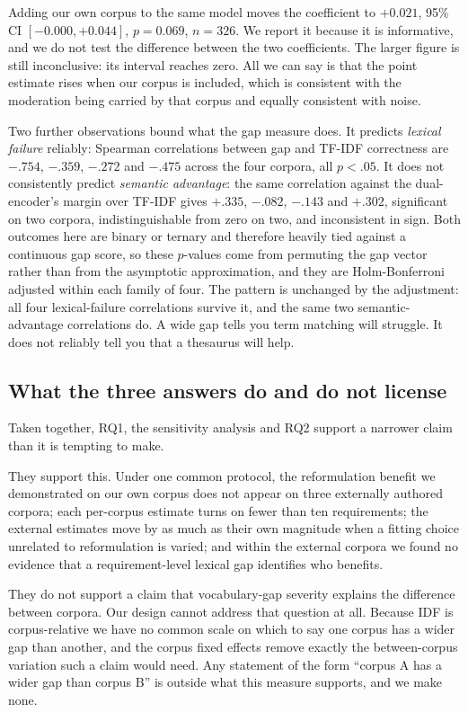 \documentclass[smallextended,natbib]{svjour3}
\begin{document}
Adding our own corpus to the same model moves the coefficient to $+0.021$, 95\% CI $[-0.000, +0.044]$, $p = 0.069$, $n = 326$. We report it because it is informative, and we do not test the difference between the two coefficients. The larger figure is still inconclusive: its interval reaches zero. All we can say is that the point estimate rises when our corpus is included, which is consistent with the moderation being carried by that corpus and equally consistent with noise.

Two further observations bound what the gap measure does. It predicts \emph{lexical failure} reliably: Spearman correlations between gap and TF-IDF correctness are $-.754$, $-.359$, $-.272$ and $-.475$ across the four corpora, all $p < .05$. It does not consistently predict \emph{semantic advantage}: the same correlation against the dual-encoder's margin over TF-IDF gives $+.335$, $-.082$, $-.143$ and $+.302$, significant on two corpora, indistinguishable from zero on two, and inconsistent in sign. Both outcomes here are binary or ternary and therefore heavily tied against a continuous gap score, so these $p$-values come from permuting the gap vector rather than from the asymptotic approximation, and they are Holm-Bonferroni adjusted within each family of four. The pattern is unchanged by the adjustment: all four lexical-failure correlations survive it, and the same two semantic-advantage correlations do. A wide gap tells you term matching will struggle. It does not reliably tell you that a thesaurus will help.

\subsection{What the three answers do and do not license}
\label{sec:results-license}

Taken together, RQ1, the sensitivity analysis and RQ2 support a narrower claim than it is tempting to make.

They support this. Under one common protocol, the reformulation benefit we demonstrated on our own corpus does not appear on three externally authored corpora; each per-corpus estimate turns on fewer than ten requirements; the external estimates move by as much as their own magnitude when a fitting choice unrelated to reformulation is varied; and within the external corpora we found no evidence that a requirement-level lexical gap identifies who benefits.

They do not support a claim that vocabulary-gap severity explains the difference between corpora. Our design cannot address that question at all. Because IDF is corpus-relative we have no common scale on which to say one corpus has a wider gap than another, and the corpus fixed effects remove exactly the between-corpus variation such a claim would need. Any statement of the form ``corpus A has a wider gap than corpus B'' is outside what this measure supports, and we make none.
\end{document}
